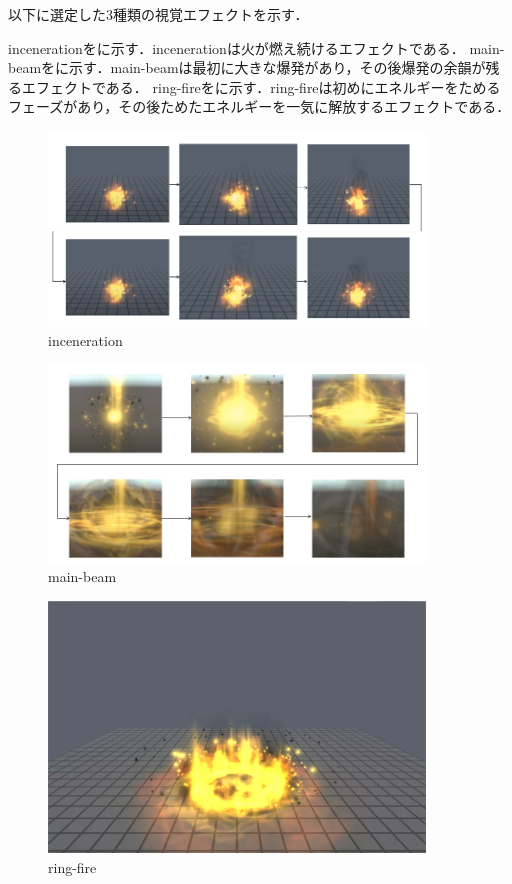 以下に選定した3種類の視覚エフェクトを示す．

incenerationをに示す．incenerationは火が燃え続けるエフェクトである．
main-beamをに示す．main-beamは最初に大きな爆発があり，その後爆発の余韻が残るエフェクトである．
ring-fireをに示す．ring-fireは初めにエネルギーをためるフェーズがあり，その後ためたエネルギーを一気に解放するエフェクトである．

\begin{figure}[h]
\centering
\includegraphics[clip,width=10cm]{./fig/fireTime.png}
\caption{inceneration}\label{fire}
\end{figure}

\begin{figure}[h]
\centering
\includegraphics[clip,width=10cm]{./fig/mainbeamTime.png}
\caption{main-beam}\label{explosion}
\end{figure}

\begin{figure}[h]
\centering
\includegraphics[clip,width=10cm]{./fig/ringfire.png}
\caption{ring-fire}\label{ringfire}
\end{figure}


